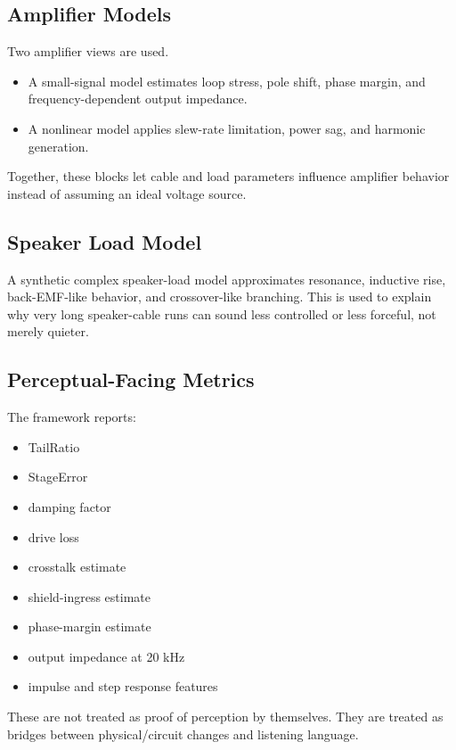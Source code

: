 \documentclass[a4paper,11pt]{article}
\begin{document}
\subsection{Amplifier Models}

Two amplifier views are used.

\begin{itemize}
  \item A small-signal model estimates loop stress, pole shift, phase margin, and frequency-dependent output impedance.
  \item A nonlinear model applies slew-rate limitation, power sag, and harmonic generation.
\end{itemize}

Together, these blocks let cable and load parameters influence amplifier
behavior instead of assuming an ideal voltage source.

\subsection{Speaker Load Model}

A synthetic complex speaker-load model approximates resonance, inductive rise,
back-EMF-like behavior, and crossover-like branching. This is used to explain
why very long speaker-cable runs can sound less controlled or less forceful,
not merely quieter.

\subsection{Perceptual-Facing Metrics}

The framework reports:

\begin{itemize}
  \item TailRatio
  \item StageError
  \item damping factor
  \item drive loss
  \item crosstalk estimate
  \item shield-ingress estimate
  \item phase-margin estimate
  \item output impedance at 20 kHz
  \item impulse and step response features
\end{itemize}

These are not treated as proof of perception by themselves. They are treated as
bridges between physical/circuit changes and listening language.
\end{document}
